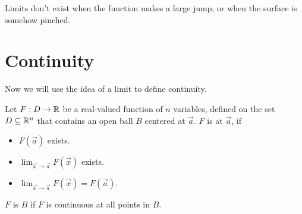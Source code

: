 \documentclass{ximera}
\begin{document}
 Limits don't exist when the function makes a large jump, or when the surface is somehow pinched.





\section{Continuity}

Now we will use the idea of a limit to define continuity.

\begin{definition}
  Let $F:D\to \mathbb R$ be a real-valued function of $n$ variables, defined on the set $D\subseteq\mathbb R^n$ that contains an open ball $B$ centered at
  $\vec{a}$. $F$ is  at $\vec{a}$, if
  \begin{itemize}
  \item $F(\vec{a})$ exists.
  \item $\lim_{\vec{x}\to\vec{a}} F(\vec{x})$ exists.
  \item $\lim_{\vec{x}\to\vec{a}} F(\vec{x}) = F(\vec{a}).$
  \end{itemize}
  $F$ is  $B$ if $F$ is continuous at
  all points in $B$.
\end{definition}
\end{document}
